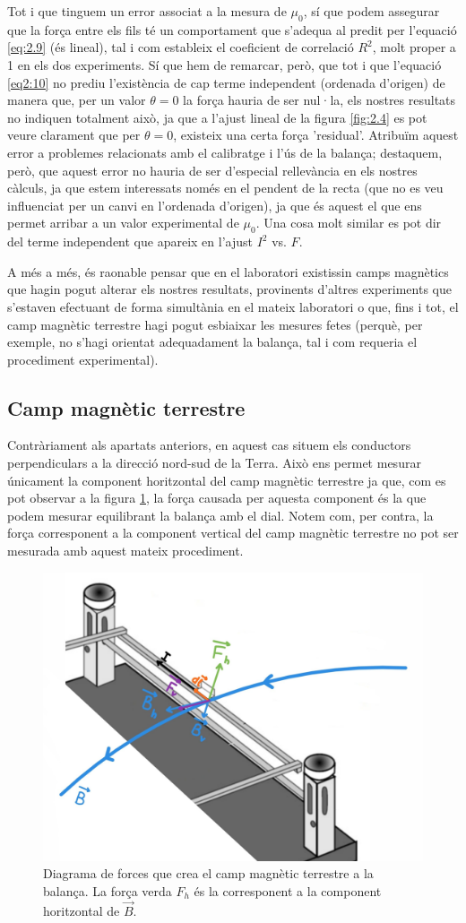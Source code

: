 \documentclass[a4paper,10.5pt]{report}
\begin{document}
Tot i que tinguem un error associat a la mesura de $\mu_0$, sí que podem assegurar que la força entre els fils té un comportament que s'adequa al predit per l'equació \ref{eq:2.9} (és lineal), tal i com estableix el coeficient de correlació $R^2$, molt proper a 1 en els dos experiments. Sí que hem de remarcar, però, que tot i que l'equació \ref{eq2:10} no prediu l'existència de cap terme independent (ordenada d'origen) de manera que, per un valor $\theta = 0$ la força hauria de ser nul·la, els nostres resultats no indiquen totalment això, ja que a l'ajust lineal de la figura \ref{fig:2.4} es pot veure clarament que per $\theta = 0$, existeix una certa força 'residual'. Atribuïm aquest error a problemes relacionats amb el calibratge i l'ús de la balança; destaquem, però, que aquest error no hauria de ser d'especial rellevància en els nostres càlculs, ja que estem interessats només en el pendent de la recta (que no es veu influenciat per un canvi en l'ordenada d'origen), ja que és aquest el que ens permet arribar a un valor experimental de $\mu_0$. Una cosa molt similar es pot dir del terme independent que apareix en l'ajust $I^2$ vs. $F$.

A més a més, és raonable pensar que en el laboratori existissin camps magnètics que hagin pogut alterar els nostres resultats, provinents d'altres experiments que s'estaven efectuant de forma simultània en el mateix laboratori o que, fins i tot, el camp magnètic terrestre hagi pogut esbiaixar les mesures fetes (perquè, per exemple, no s'hagi orientat adequadament la balança, tal i com requeria el procediment experimental).

\subsection{Camp magnètic terrestre}
Contràriament als apartats anteriors, en aquest cas situem els conductors perpendiculars a la direcció nord-sud de la Terra. Això ens permet mesurar únicament la component horitzontal del camp magnètic terrestre ja que, com es pot observar a la figura \ref{fig2:6}, la força causada per aquesta component és la que podem mesurar equilibrant la balança amb el dial. Notem com, per contra, la força corresponent a la component vertical del camp magnètic terrestre no pot ser mesurada amb aquest mateix procediment.

\begin{figure}[H]
	\centering
	\includegraphics[width=0.35\linewidth]{screenshot019}
	\caption{Diagrama de forces que crea el camp magnètic terrestre a la balança. La força verda $F_h$ és la corresponent a la component horitzontal de $\vec{B}$.}
	\label{fig2:6}
\end{figure}
\end{document}
